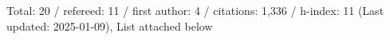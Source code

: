 Total: 20 / refereed: 11 / first author: 4 / citations: 1,336 / h-index: 11 (Last updated: 2025-01-09), List attached below